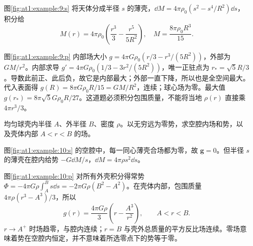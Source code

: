 \begin{solution}
  图\ref{fig:at1:example:9:s} 将天体分成半径 $s$ 的薄壳，$\dd M=4\pi\rho_0(s^2-s^4/R^2)\dd s$，积分给
  \[M(r)=4\pi\rho_0\left(\frac{r^3}3-\frac{r^5}{5R^2}\right),\quad M=\frac{8\pi\rho_0R^3}{15}.\]

  图\ref{fig:at1:example:9:p} 内部场大小 $g=4\pi G\rho_0(r/3-r^3/(5R^2))$，外部为 $GM/r^2$。内部求导 $g'=4\pi G\rho_0(1/3-3r^2/(5R^2))$，唯一正驻点为 $r_*=\sqrt5R/3$。导数此前正、此后负，故它是内部最大；外部一直下降，所以也是全空间最大。
  代入表面得 $g(R)=8\pi G\rho_0R/15=GM/R^2$，连续；球心场为零。最大值 $g(r_*)=8\pi\sqrt5G\rho_0R/27$。这道题必须积分包围质量，不能将当地 $\rho(r)$ 直接乘 $4\pi r^3/3$。\end{solution}
\begin{question}\begin{example}[厚球壳空腔的场与势]\label{at1:example:10}
均匀球壳内半径 $A$、外半径 $B$、密度 $\rho$。以无穷远为零势，求空腔内场和势，以及壳体内部 $A<r<B$ 的场。
\end{example}
\end{question}
\begin{solution}
  图\ref{fig:at1:example:10:s} 的空腔中，每一同心薄壳合场都为零，故 $\bm g=0$。但半径 $s$ 的薄壳在腔内给势 $-G\dd M/s$，$\dd M=4\pi\rho s^2\dd s$。

  图\ref{fig:at1:example:10:p} 对所有外壳积分得常势 $\Phi=-4\pi G\rho\int_A^Bs\dd s=-2\pi G\rho(B^2-A^2)$。在壳体内部，包围质量 $4\pi\rho(r^3-A^3)/3$，所以
  \[g(r)=\frac{4\pi G\rho}{3}\left(r-\frac{A^3}{r^2}\right),\qquad A<r<B.\]
  $r\to A^+$ 时场趋零，与腔内连续；$r=B$ 与壳外总质量的平方反比场连续。零场意味着势在空腔内恒定，并不意味着所选零点下的势等于零。\end{solution}

